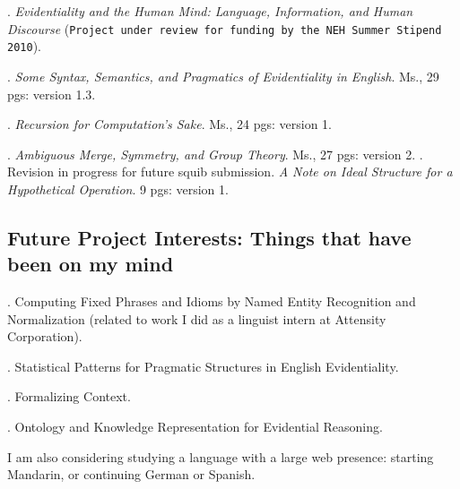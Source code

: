 \documentclass[11pt]{article}
\begin{document}
\ex. \textsl{Evidentiality and the Human Mind: Language, Information, and Human Discourse} (\texttt{Project under review for funding by the NEH Summer Stipend 2010}). 

\ex. \textsl{Some Syntax, Semantics, and Pragmatics of Evidentiality in English}. Ms., 29 pgs: version 1.3. 

\ex. \textsl{Recursion for Computation's Sake}. Ms., 24 pgs: version 1.

\ex. \textsl{Ambiguous Merge, Symmetry, and Group Theory}. Ms., 27 pgs: version 2. 
\a.  \small{Revision in progress for future squib submission. \textsl{A Note on Ideal Structure for a Hypothetical Operation}. 9 pgs: version 1}.

\subsection{Future Project Interests: Things that have been on my mind}
\ex. Computing Fixed Phrases and Idioms by Named Entity Recognition and Normalization (\small{related to work I did as a linguist intern at Attensity Corporation}).

\ex. Statistical Patterns for Pragmatic Structures in English Evidentiality. 

\ex. Formalizing Context.

\ex. Ontology and Knowledge Representation for Evidential Reasoning.

I am also considering studying a language with a large web presence: starting Mandarin, or continuing German or Spanish.  
\end{document}
